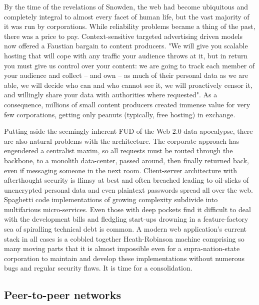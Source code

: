 By the time of the revelations of Snowden, the web had become ubiquitous and completely integral to almost every facet of human life, but the vast majority of it was run by corporations. While reliability problems became a thing of the past, there was a price to pay. Context-sensitive targeted advertising driven models now offered a Faustian bargain to content producers. "We will give you scalable hosting that will cope with any traffic your audience throws at it, but in return you must give us control over your content: we are going to track each member of your audience and collect -- and own -- as much of their personal data as we are able, we will decide who can and who cannot see it, we will proactively censor it, and willingly share your data with authorities where requested". As a consequence, millions of small content producers created immense value for very few corporations, getting only peanuts (typically, free hosting) in exchange.

Putting aside the seemingly inherent FUD of the Web 2.0 data apocalypse, there are also natural problems with the architecture. The corporate approach has engendered a centralist maxim, so all requests must be routed through the backbone, to a monolith data-center, passed around, then finally returned back, even if messaging someone in the next room. Client-server architecture with afterthought security is flimsy at best and often breached leading to oil-slicks of unencrypted personal data and even plaintext passwords spread all over the web. Spaghetti code implementations of growing complexity subdivide into multifarious micro-services. Even those with deep pockets find it difficult to deal with the development bills and fledgling start-ups drowning in a feature-factory sea of spiralling technical debt is common. A modern web application's current stack in all cases is a cobbled together Heath-Robinson machine comprising so many moving parts that it is almost impossible even for a supra-nation-state corporation to maintain and develop these implementations without numerous bugs and regular security flaws. It is time for a consolidation. 


\subsection{Peer-to-peer networks \statusgreen}\label{sec:peer_to_peer}

